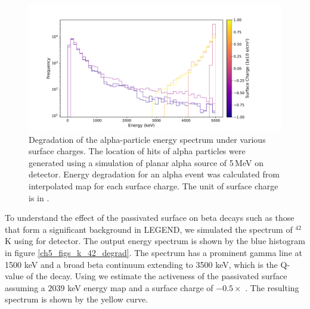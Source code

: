 \begin{figure}%
  \centering
  \includegraphics[trim={1.5cm 0.0cm 3.5cm 1.7cm},clip,width=0.99\linewidth]{ch5/figs/eng_deg_hist.pdf}
  \caption{Degradation of the alpha-particle energy spectrum under various surface charges. The location of hits of alpha particles were generated using a {\geant} simulation of planar alpha source of 5\,MeV on {\ponama} detector. Energy degradation for an alpha event was calculated from interpolated map for each surface charge. The unit of surface charge is in {\scunit}.}
  \label{fig:eng_spec_degradation}
\end{figure}

To understand the effect of the passivated surface on beta decays such as those that form a significant background in LEGEND, we simulated the spectrum of $^{42}$K using {\geant} for {\ponama} detector. The output energy spectrum is shown by the blue histogram in figure \ref{ch5_figs_k_42_degrad}. The spectrum has a prominent gamma line at 1500 keV and a broad beta continuum extending to 3500 keV, which is the Q-value of the decay. Using {\ehd} we estimate the activeness of the passivated surface assuming a $2039$ keV energy map and a surface charge of $- 0.5 \times$ {\scunit}. The resulting spectrum is shown by the yellow curve.

